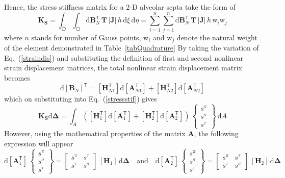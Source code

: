 Hence, the stress stiffness matrix for a 2-D alveolar septa take the form of
\begin{equation}
\mathbf{K}_\mathbf{S} = \int_{\pentagon} \int_{\pentagon}  \mathrm{d} \mathbf{B}_N^{\mathsf{T}} \, \mathbf{T} \, |\mathbf{J}|  \, h \,  \mathrm{d} \xi \,  \mathrm{d} \eta =  \sum_{i=1}^{n}  \sum_{j=1}^{n}  \mathrm{d} \mathbf{B}_N^{\mathsf{T}} \, \mathbf{T} \, |\mathbf{J}| \, h \, \mathrm{w}_i \mathrm{w}_j
\label{stressstif}
\end{equation}
where $n$ stands for number of Gauss points, $\mathrm{w}_i$ and $\mathrm{w}_j$ denote the natural weight of the element demonstrated in Table~\ref{tabQuadrature}
By taking the variation of Eq.~(\ref{straindis}) and substituting the definition of first and second nonlinear strain displacement matrices, the total nonlinear strain displacement matrix becomes
\begin{equation}
\mathrm{d}[\mathbf{B}_N]^{\mathsf{T}} = [\mathbf{H}_{N1}^{\mathsf{T}}] \mathrm{d} [\mathbf{A}_{N1}^{\mathsf{T}}] + [\mathbf{H}_{N2}^{\mathsf{T}}] \mathrm{d} [\mathbf{A}_{N2}^{\mathsf{T}}] 
\end{equation}
which on substituting into Eq.~(\ref{stressstif}) gives 
\begin{equation}
\mathbf{K_\mathbf{S}} \mathrm{d} \boldsymbol{\Delta} = \int_A \left(
[\mathbf{H}_1^{\mathsf{T}}] \mathrm{d} [\mathbf{A}_1^{\mathsf{T}}] + [\mathbf{H}_2^{\mathsf{T}}] \mathrm{d} [\mathbf{A}_2^{\mathsf{T}}]\right) \, \begin{Bmatrix} s^{\pi} \\ s^{\sigma} \\  s^{\tau} \end{Bmatrix} \, \mathrm{d} A
\end{equation}
However, using the mathematical properties of the matrix $\mathbf{A}$, the following expression will appear
\begin{equation}
\mathrm{d} [\mathbf{A}_1^{\mathsf{T}}] \, \begin{Bmatrix} s^{\pi} \\ s^{\sigma} \\  s^{\tau} \end{Bmatrix} = \begin{bmatrix}s^{\pi} & s^{\tau} \\ 
s^{\tau} & s^{\sigma} \end{bmatrix} \, [\mathbf{H}_1] \, \mathrm{d} \boldsymbol{\Delta} \quad \text{and} \quad \mathrm{d} [\mathbf{A}_2^{\mathsf{T}}] \, \begin{Bmatrix} s^{\pi} \\ s^{\sigma} \\  s^{\tau} \end{Bmatrix} = \begin{bmatrix} s^{\pi} & s^{\tau} \\ 
s^{\tau} & s^{\sigma} \end{bmatrix} \, [\mathbf{H}_2] \, \mathrm{d} \boldsymbol{\Delta}
\end{equation}
